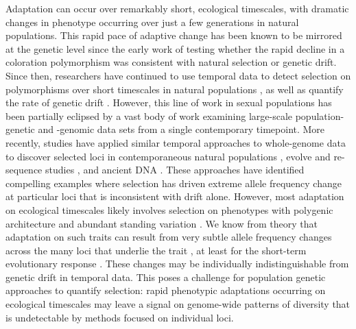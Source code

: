 \documentclass[11pt]{article}
\begin{document}
Adaptation can occur over remarkably short, ecological timescales, with
dramatic changes in phenotype occurring over just a few generations in natural
populations. This rapid pace of adaptive change has been known to be mirrored
at the genetic level since the early work of \textcite{Fisher1947-tf}  testing
whether the rapid decline in a coloration polymorphism was consistent with
natural selection or genetic drift. Since then, researchers have continued to
use temporal data to detect selection on polymorphisms over short timescales in
natural populations
\parencite{Kettlewell1958-or,Kettlewell1961-ok,Fisher1947-tf,Dobzhansky1943-lh,Dobzhansky1971-vf,Mueller1985-eo},
as well as quantify the rate of genetic drift
\parencite{Nei1981-oy,Pollak1983-xh,Mueller1985-eg,Waples1989-sj,Wang2003-ev,Prout1954-yy,Wallace1956-jb}.
However, this line of work in sexual populations has been partially eclipsed by
a vast body of work examining large-scale population-genetic and -genomic data
sets from a single contemporary timepoint. More recently, studies have applied
similar temporal approaches to whole-genome data to discover selected loci in
contemporaneous natural populations
\parencite{Bergland2014-ij,Rajpurohit2018-od}, evolve and re-sequence studies
\parencite{Burke2010-tz,Johansson2010-ya,Teotonio2009-sa,Turner2011-sx,Turner2012-bm,Franssen2017-lx,Orozco-terWengel2012-fu,Barghi2019-qy},
and ancient DNA \parencite{Mathieson2015-uw,Fu2016-ek}. These approaches have
identified compelling examples where selection has driven extreme allele
frequency change at particular loci that is inconsistent with drift alone.
However, most adaptation on ecological timescales likely involves selection on
phenotypes with polygenic architecture and abundant standing variation
\parencite{Endler1986-wd,Hendry1999-zu,Kinnison2001-vb,Kopp2009-pj}.  We know
from theory that adaptation on such traits can result from very subtle allele
frequency changes across the many loci that underlie the trait
\parencite{Bulmer1980-zo}, at least for the short-term evolutionary response
\parencite{Jain2017-mw,Jain2015-xy,Thornton2018-eo,Chevin2008-lt,Hermisson2005-hs,Hollinger2019-mn}.
These changes may be individually indistinguishable from genetic drift in
temporal data. This poses a challenge for population genetic approaches to
quantify selection: rapid phenotypic adaptations occurring on ecological
timescales may leave a signal on genome-wide patterns of diversity that is
undetectable by methods focused on individual loci.
\end{document}
